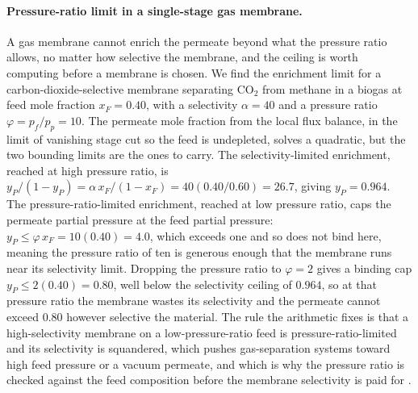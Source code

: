 \paragraph{Pressure-ratio limit in a single-stage gas membrane.} A gas
membrane cannot enrich the permeate beyond what the pressure ratio allows, no
matter how selective the membrane, and the ceiling is worth computing before a
membrane is chosen. We find the enrichment limit for a carbon-dioxide-selective
membrane separating $\text{CO}_2$ from methane in a biogas at feed mole
fraction $x_F = 0.40$, with a selectivity $\alpha = 40$ and a pressure ratio
$\varphi = p_f/p_p = 10$. The permeate mole fraction from the local flux
balance, in the limit of vanishing stage cut so the feed is undepleted,
solves a quadratic, but the two bounding limits are the ones to carry. The
selectivity-limited enrichment, reached at high pressure ratio, is
$y_P/(1 - y_P) = \alpha\,x_F/(1 - x_F) = 40(0.40/0.60) = 26.7$, giving
$y_P = 0.964$. The pressure-ratio-limited enrichment, reached at low pressure
ratio, caps the permeate partial pressure at the feed partial pressure:
$y_P \le \varphi\,x_F = 10(0.40) = 4.0$, which exceeds one and so does not
bind here, meaning the pressure ratio of ten is generous enough that the
membrane runs near its selectivity limit. Dropping the pressure ratio to
$\varphi = 2$ gives a binding cap $y_P \le 2(0.40) = 0.80$, well below the
selectivity ceiling of $0.964$, so at that pressure ratio the membrane wastes
its selectivity and the permeate cannot exceed $0.80$ however selective the
material. The rule the arithmetic fixes is that a high-selectivity membrane on
a low-pressure-ratio feed is pressure-ratio-limited and its selectivity is
squandered, which pushes gas-separation systems toward high feed pressure or a
vacuum permeate, and which is why the pressure ratio is checked against the
feed composition before the membrane selectivity is paid for
\cite{text:bird-transport-phenomena}.

